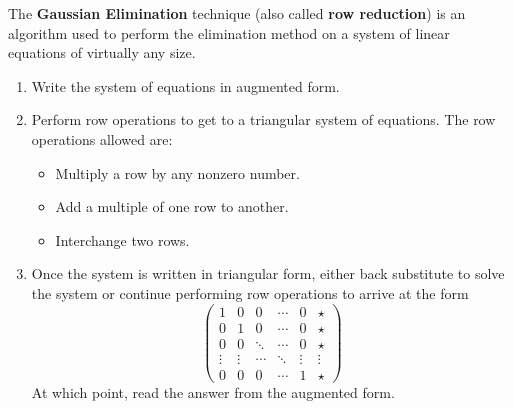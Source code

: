 \begin{definition}
    The {\bf Gaussian Elimination} technique (also called {\bf row reduction}) is an
    algorithm used to perform the elimination method on a system of linear equations of
    virtually any size.
    \begin{enumerate}
        \item Write the system of equations in augmented form.
        \item Perform row operations to get to a triangular system of equations.  The row
            operations allowed are:
            \begin{itemize}
                \item Multiply a row by any nonzero number.
                \item Add a multiple of one row to another.
                \item Interchange two rows.
            \end{itemize}
        \item Once the system is written in triangular form, either back substitute to solve the
            system or continue performing row operations to arrive at the form
            \[ \left( \begin{array}{ccccc|c} 1 & 0 & 0 & \cdots & 0 & \star \\
                    0 & 1 & 0 & \cdots & 0 & \star \\
                    0 & 0 & \ddots & \cdots & 0 & \star \\
                    \vdots & \vdots & \cdots & \ddots & \vdots & \vdots \\
                    0 & 0 & 0 & \cdots & 1 & \star \end{array} \right) \]
            At which point, read the answer from the augmented form.
    \end{enumerate}
\end{definition}

